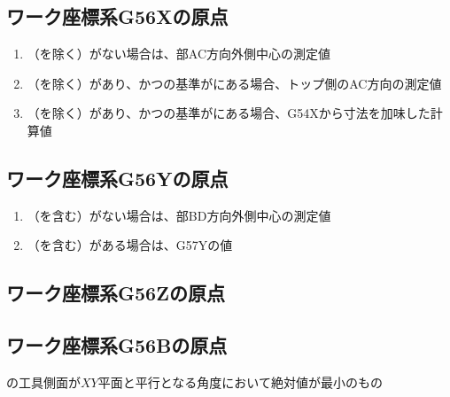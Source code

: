 \subsection{ワーク座標系{\ttfamily G56X}の原点}
\begin{enumerate}[label*=\sarrow]
\item \TopOutcut（\TopCurvedOutcut を除く）がない場合は、\TopEndFace 部AC方向外側中心の測定値
\item \TopOutcut（\TopCurvedOutcut を除く）があり、かつ\OutcutCenter の基準が\TopOutcut にある場合、トップ側のAC方向\OutcutCenter の測定値
\item \TopOutcut（\TopCurvedOutcut を除く）があり、かつ\OutcutCenter の基準が\BottomOutcut にある場合、{\ttfamily G54X}から\CenterlineEndFaceDif 寸法を加味した計算値
\end{enumerate}


\subsection{ワーク座標系{\ttfamily G56Y}の原点}
\begin{enumerate}[label*=\sarrow]
\item \TopOutcut（\TopCurvedOutcut を含む）がない場合は、\TopEndFace 部BD方向外側中心の測定値
\item \TopOutcut（\TopCurvedOutcut を含む）がある場合は、{\ttfamily G57Y}の値
\end{enumerate}


\subsection{ワーク座標系{\ttfamily G56Z}の原点\TBW}


\subsection{ワーク座標系{\ttfamily G56B}の原点}
\Jig の工具側面が$XY$平面と平行となる角度において絶対値が最小のもの


